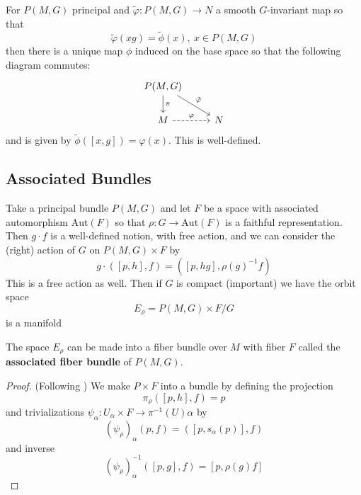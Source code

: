 		\begin{prop}
			For $P(M,G)$ principal and $\tilde \varphi: P(M,G) \rightarrow N$ a smooth $G$-invariant map so that 
			\begin{equation}
				\tilde \varphi(x g) = \tilde \phi (x), ~ x \in P(M,G)
			\end{equation}
			then there is a unique map $\phi$ induced on the base space so that the following diagram commutes:
			\[
			\begin{tikzcd}
				P(M,G) \arrow{d}{\pi} \arrow{rd}{\tilde \varphi}\\
				M \arrow[r,dashed, "\varphi"] & N
			\end{tikzcd}
			\]
			and is given by $\tilde \phi([x, g]) = \varphi(x)$. This is well-defined.
		\end{prop}
		
		\subsection{Associated Bundles}
		Take a principal bundle $P(M,G)$ and let $F$ be a space with associated automorphism $\mathrm{Aut}(F)$ so that $\rho: G \rightarrow \mathrm{Aut}(F)$ is a faithful representation. Then $g \cdot f$ is a well-defined notion, with free action, and we can consider the (right) action of $G$ on $P(M,G) \times F$ by
		\begin{equation}
			g \cdot ([p, h], f) = ([p, hg], \rho(g)^{-1} f)
		\end{equation}
		This is a free action as well. Then if $G$ is compact (important) we have the orbit space
		\begin{equation}
			E_\rho = P(M,G) \times F/G
		\end{equation}
		is a manifold
		
		\begin{theorem}
			The space $E_\rho$ can be made into a fiber bundle over $M$ with fiber $F$ called the \textbf{associated fiber bundle} of $P(M,G)$. 
		\end{theorem}
		\begin{proof}
			(Following \cite{lindenhovius2011})
			We make $P \times F$ into a bundle by defining the projection 
			\begin{equation}
				\pi_\rho ([p, h], f) = p
			\end{equation}
			and trivializations $\psi_\alpha: U_\alpha \times F \rightarrow \pi^{-1}(U)\alpha$ by
			\begin{equation}
				(\psi_\rho)_\alpha (p, f) = ([p, s_\alpha (p)] , f)
			\end{equation}
			and inverse
			\begin{equation}
				(\psi_\rho)_\alpha^{-1} ([p, g], f) = [p, \rho(g) f]
			\end{equation}
		\end{proof}
		
